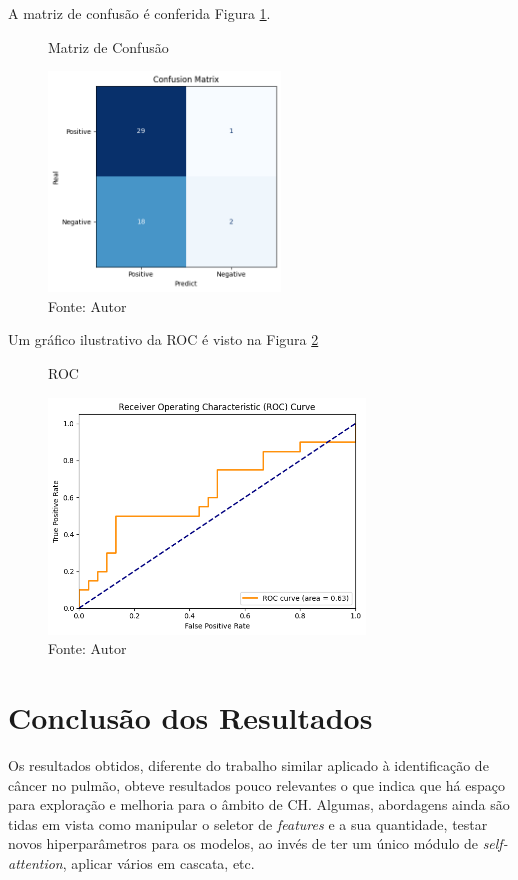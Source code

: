 A matriz de confusão é conferida Figura \ref{fig:fig016}.

\begin{figure}[htbp]
    \caption{Matriz de Confusão}
    \centering
    \includegraphics[width=0.55\textwidth]{figures/fig016.png}
    \caption{Fonte: Autor}
    \label{fig:fig016}
\end{figure}

Um gráfico ilustrativo da \gls{ROC} é visto na Figura \ref{fig:fig017}

\begin{figure}[htbp]
    \caption{ROC}
    \centering
    \includegraphics[width=0.75\textwidth]{figures/fig017.png}
    \caption{Fonte: Autor}
    \label{fig:fig017}
\end{figure}

\section{Conclusão dos Resultados} 
\label{sec:cap6_conclusãp_resultados}

Os resultados obtidos, diferente do trabalho similar aplicado à identificação de câncer no pulmão, obteve resultados pouco relevantes o que indica que há espaço para exploração e melhoria para o âmbito de \gls{CH}. Algumas, abordagens ainda são tidas em vista como manipular o seletor de \textit{features} e a sua quantidade, testar novos hiperparâmetros para os modelos, ao invés de ter um único módulo de \textit{self-attention}, aplicar vários em cascata, etc.





